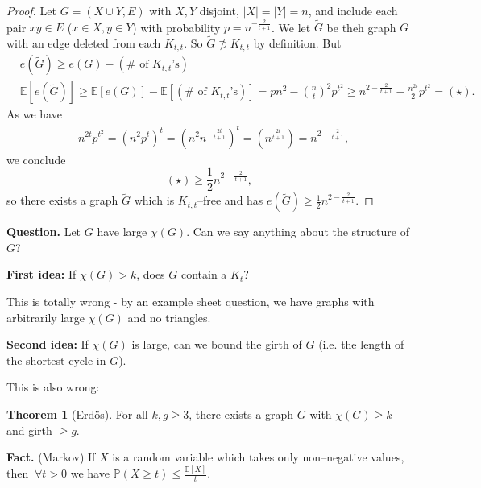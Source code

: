 \documentclass{article}
\theoremstyle{definition}
\newtheorem{theorem}{Theorem}[section]
\begin{document}

\begin{proof}
    Let $G=(X \cup Y, E)$ with $X,Y$ disjoint, $|X|=|Y|=n$, and include each pair $xy \in E$ ($x \in X, y \in Y$) with probability $p=n^{-\frac{2}{t+1}}$. We let $\tilde{G}$ be theh graph $G$ with an edge deleted from each $K_{t,t}$. So $\tilde{G} \not\supset K_{t,t}$ by definition. But 
    \begin{align*}
        &e(\tilde{G}) \ge e(G) - (\# \text{ of }K_{t,t}\text{'s}) \\
        &\mathbb{E}[e(\tilde{G})] \ge \mathbb{E}[e(G)] - \mathbb{E}[(\# \text{ of }K_{t,t}\text{'s})] = pn^2 - {{n}\choose{t}}^2 p^{t^2} \ge n^{2- \frac{2}{t+1}} - \frac{n^{2t}}{2}p^{t^2} =(\star).
    \end{align*}
    As we have
    \begin{align*}
        &n^{2t} p^{t^2} = (n^2 p^t)^t = (n^2 n^{-\frac{2t}{t+1}})^t = (n^{\frac{2t}{t+1}}) = n^{2-\frac{2}{t+1}},
    \end{align*}
    we conclude \[
    (\star) \ge \frac{1}{2}n^{2-\frac{2}{t+1}},
    \]
    so there exists a graph $\tilde{G}$ which is $K_{t,t}$--free and has $e(\tilde{G}) \ge \frac{1}{2}n^{2-\frac{2}{t+1}}.$
\end{proof}

\textbf{Question.} Let $G$ have large $\chi(G)$. Can we say anything about the structure of $G$?

\textbf{First idea:} If $\chi(G)>k$, does $G$ contain a $K_t$? 

This is totally wrong - by an example sheet question, we have graphs with arbitrarily large $\chi(G)$ and no triangles.

\textbf{Second idea:} If $\chi(G)$ is large, can we bound the girth of $G$ (i.e. the length of the shortest cycle in $G$).

This is also wrong:
\begin{theorem}[Erdös]\label{6.2}
    For all $k,g\ge 3$, there exists a graph $G$ with $\chi(G)\ge k$ and girth $\ge g$.
\end{theorem}
\textbf{Fact.} (Markov) If $X$ is a random variable which takes only non--negative values, then $~\forall t>0$ we have $\mathbb{P}(X\ge t) \le \frac{\mathbb{E}[X]}{t}$.
\vspace{1mm}
\end{document}
